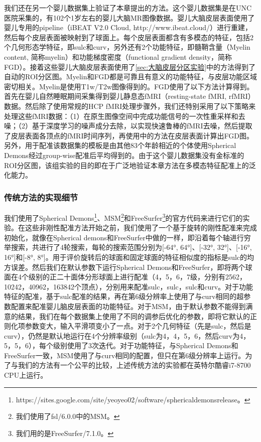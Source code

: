 我们还在另一个婴儿数据集上验证了本章提出的方法。这个婴儿数据集是在UNC医院采集的，有102个1岁左右的婴儿大脑MR图像数据。婴儿大脑皮层表面使用了婴儿专用的pipeline\cite{li2015construction,li2014measuring,wang2018volume}（iBEAT V2.0 Cloud, http://www.ibeat.cloud/）进行重建，然后每个皮层表面被映射到了球面上。每个皮层表面都含有多模态的特征，包括2个几何形态学特征，即sulc和curv，另外还有2个功能特征，即髓鞘含量（Myelin content, 简称myelin）和功能梯度密度（functional gradient density，简称FGD）。接着这些婴儿大脑皮层表面使用了\ref{sec:大脑皮层分区实验}中的方法得到了自动的ROI分区图。Myelin和FGD都是可靠且有意义的功能特征，与皮层功能区域密切相关\cite{glasser2016multi}。Myelin是使用T1w/T2w图像得到的。FGD使用了以下方法计算得到。首先在婴儿自然睡眠期间采集得到婴儿静息态fMRI（resting-state fMRI, rfMRI）数据。然后除了使用常规的HCP fMRI处理步骤\cite{glasser2013minimal}外，我们还特别采用了以下策略\cite{hu2020disentangled}来处理这些fMRI数据：（1）在原生图像空间中完成功能信号的一次性重采样和去噪；（2）基于深度学习的噪声成分去除，以实现快速鲁棒的fMRI去噪，然后提取了皮层表面各顶点的fMRI时间序列，再使用\cite{huang2020construction,gordon2016generation}中的方法在皮层表面计算出FGD图。另外，用于配准该数据集的模板是由其他83个年龄相近的个体使用Spherical Demons\cite{yeo2009spherical}经过group-wise配准后平均得到的。由于这个婴儿数据集没有金标准的ROI分区图，该组实验的目的即在于广泛地验证本章方法在多模态特征配准上的泛化能力。

\subsubsection{传统方法的实现细节}\label{sec:配准的基准方法}
我们使用了Spherical Demons\footnote{https://sites.google.com/site/yeoyeo02/software/sphericaldemonsrelease。}、MSM\footnote{我们使用了fsl/6.0.0中的MSM。}和FreeSurfer\footnote{我们用的是FreeSurfer/7.1.0。}的官方代码来进行它们的实验。在这些非刚性配准方法开始之前，我们使用了一个基于旋转的刚性配准来完成初始化，就像在Spherical demons\cite{yeo2009spherical}和FreeSurfer\cite{fischl2012freesurfer}中做的一样，即沿着每个轴进行穷举搜索，共进行了4轮搜索，每轮的搜索范围分别为[-64°, 64°]、[-32°, 32°]、[-16°, 16°]和[-8°, 8°]。用于评价旋转后的球面和固定球面的特征相似度的指标是sulc的均方误差。然后我们在默认参数下运行Spherical Demons和FreeSurfer，即将两个球面在4个级别的正二十面体分形球面上进行配准（4，5，6，7级，分别有2562，10242，40962，163842个顶点），分别用来配准sulc，sulc，sulc和curv。对于功能特征的配准，基于sulc配准的结果，再在第6级分辨率上使用了与curv相同的超参数配置来配准婴儿脑皮层表面的功能特征。对于MSM，由于默认参数不能得到满意的结果，我们在每个数据集上使用了不同的调参后优化的参数，即将它默认的正则化项参数变大，输入平滑项变小了一点。对于2个几何特征（先是sulc，然后是curv），仍然是默认地运行在4个分辨率级别（sulc为4，4，5，6，然后curv为4，5，5，6），每个级别使用了3次迭代。对于功能特征，与Spherical Demons和FreeSurfer一致，MSM使用了与curv相同的配置，但只在第6级分辨率上运行。为了与我们的方法有一个公平的比较，上述传统方法的实验都在英特尔酷睿i7-8700 CPU上运行。

